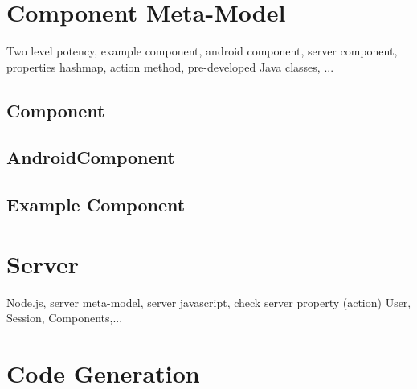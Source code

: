 \section{Component Meta-Model}

Two level potency, example component, android component, server component, properties hashmap, action method, pre-developed Java classes, ...

\subsection{Component}

\subsection{AndroidComponent}

\subsection{Example Component}


\section{Server}

Node.js, server meta-model, server javascript, check server property (action)
User, Session, Components,...

\section{Code Generation}



